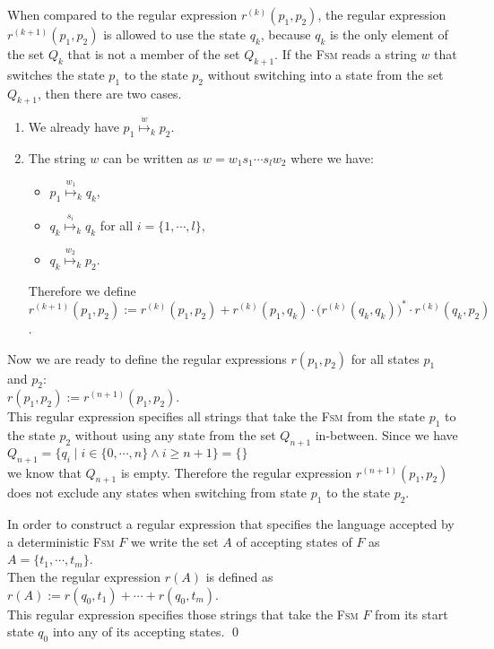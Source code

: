 \begin{enumerate}
  When compared to the regular expression $r^{(k)}(p_1, p_2)$,
  the regular expression  $r^{(k+1)}(p_1, p_2)$ is allowed to use the state
  $q_k$, because $q_k$ is the only element of the set $Q_k$ that is not a member of the set $Q_{k+1}$.  
  If the \textsc{Fsm} reads a string $w$ that switches the state $p_1$ to the state $p_2$ without switching into a state
  from the set $Q_{k+1}$, then there are two cases.
  \begin{enumerate}
  \item We already have $p_1 \stackrel{w}{\mapsto}_k p_2$.
  \item The string $w$ can be written as  $w = w_1 s_1\cdots s_l w_2$ where we have:
        \begin{itemize}
        \item $p_1 \stackrel{w_1}{\mapsto}_k q_k$,
        \item $q_k \stackrel{s_i}{\mapsto}_k q_k$ \quad for all $i = \{ 1, \cdots, l\}$,
        \item $q_k \stackrel{w_2}{\mapsto}_k p_2$.
        \end{itemize}
        Therefore we define
        \\[0.2cm]
        \hspace*{1.3cm}
        $r^{(k+1)}(p_1,p_2) := 
         r^{(k)}(p_1,p_2) + 
         r^{(k)}(p_1,q_k) \cdot \bigl(r^{(k)}(q_k,q_k)\bigr)^* \cdot r^{(k)}(q_k,p_2)$.
  \end{enumerate}  
\end{enumerate}
Now we are ready to define the regular expressions $r(p_1,p_2)$ for all states $p_1$ and $p_2$:
\\[0.2cm]
\hspace*{1.3cm}
$r(p_1,p_2) := r^{(n+1)}(p_1,p_2)$. 
\\[0.2cm]
This regular expression specifies all strings that take the \textsc{Fsm} from the state
$p_1$ to the state $p_2$ without using any state from the set 
$Q_{n+1}$ in-between.   Since we have
\\[0.2cm]
\hspace*{1.3cm}
$Q_{n+1} = \bigl\{ q_i \mid i \in \{0,\cdots,n \} \wedge i \geq n+1 \bigr\} = \{\}$
\\[0.2cm]
we know that $Q_{n+1}$ is empty.
Therefore the regular expression $r^{(n+1)}(p_1,p_2)$
does not exclude any states when switching from
state $p_1$ to the state $p_2$.

In order to construct a regular expression that specifies the language accepted by a deterministic \textsc{Fsm}
$F$ we write the set $A$ of accepting states of $F$ as
\\[0.2cm]
\hspace*{1.3cm}
$A = \{ t_1, \cdots, t_m \}$.
\\[0.2cm]
Then the regular expression $r(A)$ is defined as
\\[0.2cm]
\hspace*{1.3cm}
$r(A) := r(q_0, t_1) + \cdots + r(q_0, t_m)$.
\\[0.2cm]
This regular expression specifies those strings that take the \textsc{Fsm} $F$ from its start state $q_0$ into
any of its accepting states.
\qed


